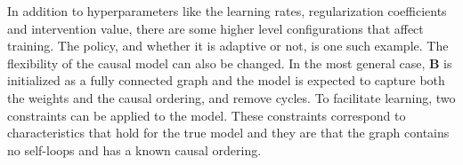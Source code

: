 \documentclass{article}
\begin{document}
In addition to hyperparameters like the learning rates, regularization coefficients and intervention value, there are some higher level configurations that affect training. The policy, and whether it is adaptive or not, is one such example. The flexibility of the causal model can also be changed. In the most general case, $\mathbf{B}$ is initialized as a fully connected graph and the model is expected to capture both the weights and the causal ordering, and remove cycles. To facilitate learning, two constraints can be applied to the model. These constraints correspond to characteristics that hold for the true model and they are that the graph contains no self-loops and has a known causal ordering.

\printbibliography
\end{document}

